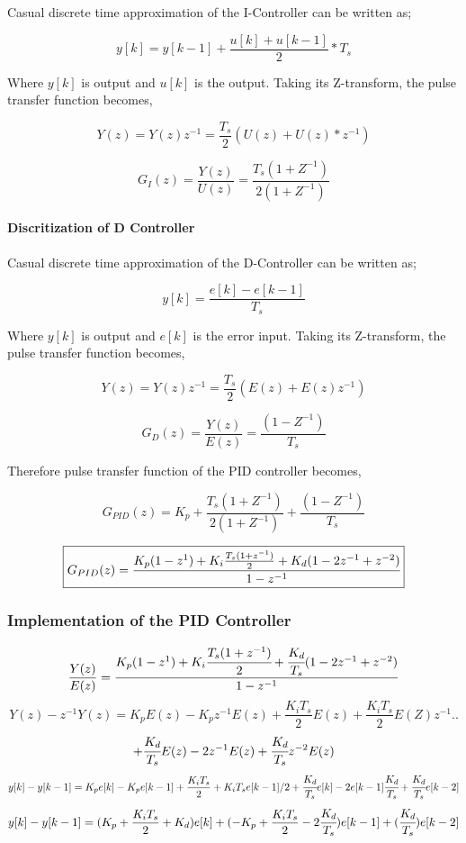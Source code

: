 \documentclass[a4paper,12pt]{article}
\begin{document}
\begin{enumerate}
		Casual discrete time approximation of the I-Controller can be written as;
	
	$$  y[k]=y[k-1]+\frac{u[k]+u[k-1]}{2}*T_s $$
	
	Where $y[k]$ is output and $u[k]$ is the output. Taking its Z-transform, the pulse transfer function becomes,
		
	$$ Y(z) = Y(z) z^{-1}=\frac{T_s}{2}\left(U(z)+U(z)*z^{-1} \right) $$
	
	$$ G_I(z)=\frac{Y(z)}{U(z)}=\frac{T_s (1+Z^{-1})}{2 (1+Z^{-1})} $$
	
	\paragraph*{ Discritization of D Controller }
	
	Casual discrete time approximation of the D-Controller can be written as;
	
	$$  y[k]=\frac{e[k]-e[k-1]}{T_s} $$
	
	Where $y[k]$ is output and $e[k]$ is the error input. Taking its Z-transform, the pulse transfer function becomes,
	
	$$ Y(z) = Y(z) z^{-1}=\frac{T_s}{2}\left(E(z)+E(z) z^{-1} \right) $$
	
	$$ G_D(z)=\frac{Y(z)}{E(z)}=\frac{(1-Z^{-1})}{T_s} $$


	Therefore pulse transfer function of the PID controller becomes,
	
	$$ G_{PID}(z)=K_p+	\frac{T_s (1+Z^{-1})}{2 (1+Z^{-1})} + \frac{(1-Z^{-1})}{T_s} $$

	$$ \boxed{	 G_{PID}(z)=\cfrac{K_p(1-z^{1})+K_i \frac{T_s (1+z^{-1})}{2}+K_d (1-2z^{-1}+z^{-2})}{1-z^{-1}}	}$$	
	
	\subsubsection*{Implementation of the PID Controller}
	
	$$ \frac{Y(z)}{E(z)}=\frac{K_p(1-z^{1})+K_i \cfrac{T_s (1+z^{-1})}{2}+\cfrac{K_d}{T_s} (1-2z^{-1}+z^{-2})}{1-z^{-1}}$$
	$$ Y(z)-z^{-1} Y(z)=K_p E(z)-K_p z^{-1} E(z)+\frac{K_i T_s}{2} E(z) +\frac{K_i T_s}{2} E(Z) z^{-1} .. $$
	$$ +\cfrac{K_d}{T_s} E(z)-2 z^{-1} E(z)+\cfrac{K_d}{T_s} z^{-2} E(z)	$$
	$$ y[k]-y[k-1]=K_p e[k]-K_p e[k-1]+\frac{K_i T_s}{2}+K_i T_s e[k-1]/2+\cfrac{K_d}{T_s} e[k]-2 e[k-1] \cfrac{K_d}{T_s}+ \cfrac{K_d}{T_s} e[k-2]	$$
	$$ y[k]-y[k-1] = (K_p+\frac{K_i T_s}{2}+K_d) e[k]+(-K_p+\frac{K_i T_s}{2}-2 \cfrac{K_d}{T_s} ) e[k-1]+(\cfrac{K_d}{T_s}) e[k-2] $$


\end{enumerate}
\end{document}
